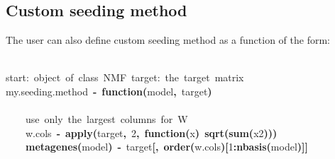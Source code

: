 \documentclass[a4paper]{article}\usepackage{graphicx, color}
\makeatletter
\newcommand{\hlnumber}[1]{\textcolor[rgb]{0,0,0}{#1}}%
\newcommand{\hlfunctioncall}[1]{\textcolor[rgb]{0.501960784313725,0,0.329411764705882}{\textbf{#1}}}%
\newcommand{\hlkeyword}[1]{\textcolor[rgb]{0,0,0}{\textbf{#1}}}%
\newcommand{\hlcomment}[1]{\textcolor[rgb]{0.180392156862745,0.6,0.341176470588235}{#1}}%
\newcommand{\hlformalargs}[1]{\textcolor[rgb]{0.690196078431373,0.250980392156863,0.0196078431372549}{#1}}%
\newcommand{\hlassignement}[1]{\textcolor[rgb]{0,0,0}{\textbf{#1}}}%
\newcommand{\hlsymbol}[1]{\textcolor[rgb]{0,0,0}{#1}}%
\newcommand{\hlstd}[1]{\textcolor[rgb]{0,0,0}{#1}}%
\newenvironment{kframe}{%
 \def\FrameCommand##1{\hskip\@totalleftmargin \hskip-\fboxsep
 \colorbox{shadecolor}{##1}\hskip-\fboxsep
     \hskip-\linewidth \hskip-\@totalleftmargin \hskip\columnwidth}%
 \MakeFramed {\advance\hsize-\width
   \@totalleftmargin\z@ \linewidth\hsize
   \@setminipage}}%
 {\par\unskip\endMakeFramed}
\newenvironment{knitrout}{}{} %
\makeatother
\begin{document}
\subsection{Custom seeding method}\label{sec:seed_custom}

The user can also define custom seeding method as a function of the form:


\begin{knitrout}
\color{fgcolor}\begin{kframe}
\begin{flushleft}
\ttfamily\noindent
\hspace*{\fill}\\
\hlstd{}\hlcomment{\usebox{\hlnormalsizeboxhash}{\ }start:{\ }object{\ }of{\ }class{\ }NMF{\ }target:{\ }the{\ }target{\ }matrix}\hspace*{\fill}\\
\hlstd{}\hlsymbol{my.seeding.method}{\ }\hlassignement{\usebox{\hlnormalsizeboxlessthan}-}{\ }\hlkeyword{function}\hlkeyword{(}\hlformalargs{model}\hlkeyword{,}{\ }\hlformalargs{target}\hlkeyword{)}{\ }\hlkeyword{\usebox{\hlnormalsizeboxopenbrace}}\hspace*{\fill}\\
\hlstd{}\hspace*{\fill}\\
\hlstd{}{\ }{\ }{\ }{\ }\hlcomment{\usebox{\hlnormalsizeboxhash}{\ }use{\ }only{\ }the{\ }largest{\ }columns{\ }for{\ }W}\hspace*{\fill}\\
\hlstd{}{\ }{\ }{\ }{\ }\hlsymbol{w.cols}{\ }\hlassignement{\usebox{\hlnormalsizeboxlessthan}-}{\ }\hlfunctioncall{apply}\hlkeyword{(}\hlsymbol{target}\hlkeyword{,}{\ }\hlnumber{2}\hlkeyword{,}{\ }\hlkeyword{function}\hlkeyword{(}\hlformalargs{x}\hlkeyword{)}{\ }\hlfunctioncall{sqrt}\hlkeyword{(}\hlfunctioncall{sum}\hlkeyword{(}\hlsymbol{x}\hlkeyword{\usebox{\hlnormalsizeboxhat}}\hlnumber{2}\hlkeyword{)}\hlkeyword{)}\hlkeyword{)}\hspace*{\fill}\\
\hlstd{}{\ }{\ }{\ }{\ }\hlfunctioncall{metagenes}\hlkeyword{(}\hlsymbol{model}\hlkeyword{)}{\ }\hlassignement{\usebox{\hlnormalsizeboxlessthan}-}{\ }\hlsymbol{target}\hlkeyword{[}\hlkeyword{,}{\ }\hlfunctioncall{order}\hlkeyword{(}\hlsymbol{w.cols}\hlkeyword{)}\hlkeyword{[}\hlnumber{1}\hlkeyword{:}\hlfunctioncall{nbasis}\hlkeyword{(}\hlsymbol{model}\hlkeyword{)}\hlkeyword{]}\hlkeyword{]}\hspace*{\fill}\\

\end{flushleft}
\end{kframe}
\end{knitrout}
\end{document}
